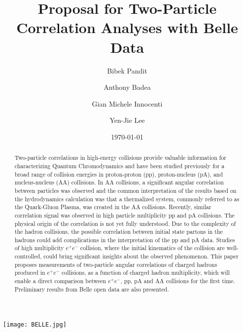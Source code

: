 \documentclass[%
preprint,
bibnotes,
]{revtex4-1}
\begin{document}
\texttt{[image: BELLE.jpg]}
\title{Proposal for Two-Particle Correlation Analyses with Belle Data}%

\author{Bibek Pandit}%
\author{Anthony Badea}%
\author{Gian Michele Innocenti}%
\author{Yen-Jie Lee}


\date{\today}%

\begin{abstract}
Two-particle correlations in high-energy collisions provide valuable information for characterizing Quantum Chromodynamics and have been studied previously for a broad range of collision energies in proton-proton (pp), proton-nucleus (pA), and nucleus-nucleus (AA) collisions. In AA collisions, a significant angular correlation between particles was observed and the common interpretation of the results based on the hydrodynamics calculation was that a thermalized system, commonly referred to as the Quark-Gluon Plasma, was created in the AA collisions. Recently, similar correlation signal was observed in high particle multiplicity pp and pA collisions. The physical origin of the correlation is not yet fully understood. Due to the complexity of the hadron collisions, the possible correlation between initial state partons in the hadrons could add complications in the interpretation of the pp and pA data. Studies of high multiplicity $e^+e^-$ collision, where the initial kinematics of the collision are well-controlled, could bring significant insights about the observed phenomenon. This paper proposes measurements of two-particle angular correlations of charged hadrons produced in $e^+e^-$ collisions, as a function of charged hadron multiplicity, which will enable a direct comparison between $e^+e^-$, pp, pA and AA collisions for the first time. Preliminary results from Belle open data are also presented.
\end{abstract}
\end{document}
